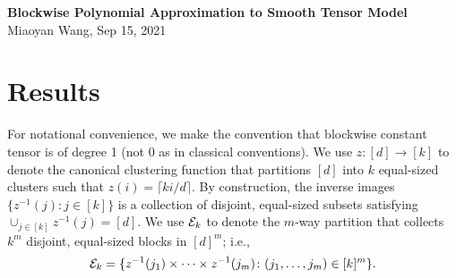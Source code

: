 \documentclass[11pt]{article}
\theoremstyle{definition}
\begin{document}
\begin{center}
{\bf \large Blockwise Polynomial Approximation to Smooth Tensor Model}\\
Miaoyan Wang, Sep 15, 2021\\
\end{center}


\section{Results}
For notational convenience, we make the convention that blockwise constant tensor is of degree 1 (not 0 as in classical conventions). We use $z\colon[d]\to[k]$ to denote the canonical clustering function that partitions $[d]$ into $k$ equal-sized clusters such that $z(i)=\lceil ki/d\rceil$. By construction, the inverse images $\{z^{-1}(j)\colon j\in[k]\}$ is a collection of disjoint, equal-sized subsets satisfying $\cup_{j\in[k]} z^{-1}(j)=[d]$. We use $\mathcal{E}_k$ to denote the $m$-way partition that collects $k^m$ disjoint, equal-sized blocks in $[d]^m$; i.e.,
\[
\mathcal{E}_k= \{z^{-1}(j_1) \times \cdots \times z^{-1}(j_m)\colon (j_1,\ldots,j_m)\in[k]^m\}. 
\]
\end{document}
